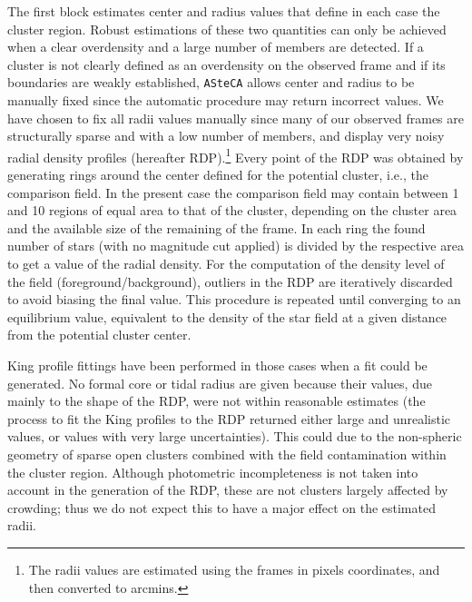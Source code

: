 \documentclass[draft]{aa}
\begin{document}
The first block estimates center and radius values that define in each case the
cluster region. Robust estimations of these two quantities can only be achieved
when a clear overdensity and a large number of members are detected.
If a cluster is not clearly defined as an overdensity on the observed frame and
if its boundaries are weakly established, \texttt{ASteCA} allows center and
radius to be manually fixed since the automatic procedure may return incorrect
values. We have chosen to fix all radii values manually since many of
our observed frames are structurally sparse and with a low number of members,
and display very noisy radial density profiles (hereafter RDP).\footnote{
The radii values are estimated using the frames in pixels coordinates,
and then converted to arcmins.
}
%
Every point of the RDP was obtained by generating rings around the
center defined for the potential cluster, i.e., the comparison field.
In the present case the comparison field may contain between 1 and 10 regions
of equal area to that of the cluster, depending on the cluster area and the
available size of the remaining of the frame. In each ring the found number of
stars (with no magnitude cut applied) is divided by the respective
area to get a value of the radial density.
For the computation of the density level of the field (foreground/background),
outliers in the RDP are iteratively discarded to avoid biasing the final value.
This procedure is repeated until converging to an equilibrium value, equivalent
to the density of the star field at a given distance from the potential
cluster center.

King profile \citep{King_1962} fittings have been performed in those cases when
a fit could be generated. No formal core or tidal radius are given because
their values, due mainly to the shape of the RDP, were not within reasonable
estimates (the process to fit the King profiles to the RDP returned either
large and unrealistic values, or values with very large uncertainties).
This could due to the non-spheric geometry of sparse open clusters
combined with the field contamination within the cluster region. Although
photometric incompleteness is not taken into account in the generation of the
RDP, these are not clusters largely affected by crowding; thus we do not
expect this to have a major effect on the estimated radii.\\
\end{document}
